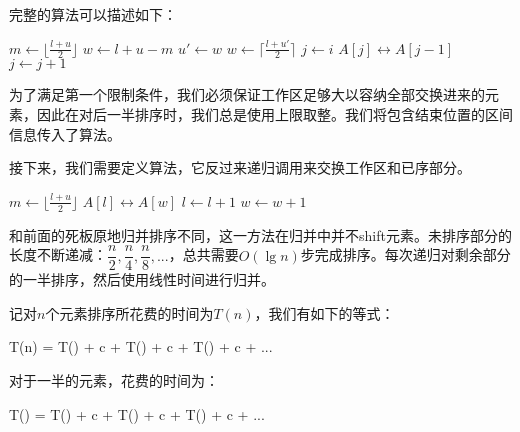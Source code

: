 \documentclass[UTF8]{article}
\begin{document}
完整的算法可以描述如下：

\begin{algorithmic}[1]
    \State $m \gets \lfloor \frac{l + u}{2} \rfloor$
    \State $w \gets l + u - m$
    \State {} 
      \State $u' \gets w$
      \State $w \gets \lceil \frac{l + u'}{2} \rceil$ 
      \State {} 
      \State {}
    \EndWhile
     
      \State $j \gets i$
        \State {} $A[j] \leftrightarrow A[j-1]$
        \State $j \gets j + 1$
      \EndWhile
    \EndFor
  \EndIf
\EndProcedure
\end{algorithmic}

为了满足第一个限制条件，我们必须保证工作区足够大以容纳全部交换进来的元素，因此在对后一半排序时，我们总是使用上限取整。我们将包含结束位置的区间信息传入了算法。

接下来，我们需要定义算法，它反过来递归调用来交换工作区和已序部分。

\begin{algorithmic}[1]
    \State $m \gets \lfloor \frac{l + u}{2} \rfloor$
    \State {}
    \State {}
    \State {}
  \Else {}
      \State {} $A[l] \leftrightarrow A[w]$
      \State $l \gets l + 1$
      \State $w \gets w + 1$
    \EndWhile
  \EndIf
\EndProcedure
\end{algorithmic}

和前面的死板原地归并排序不同，这一方法在归并中并不shift元素。未排序部分的长度不断递减：$\dfrac{n}{2}, \dfrac{n}{4}, \dfrac{n}{8}, ...$，总共需要$O(\lg n)$步完成排序。每次递归对剩余部分的一半排序，然后使用线性时间进行归并。

记对$n$个元素排序所花费的时间为$T(n)$，我们有如下的等式：

\be
T(n) = T() + c  + T() + c  + T() + c  + ...
\label{eq:in-place-sort-time}
\ee

对于一半的元素，花费的时间为：

\be
T() = T() + c  + T() + c  + T() + c  + ...
\label{eq:in-place-sort-time-half}
\ee
\end{document}

